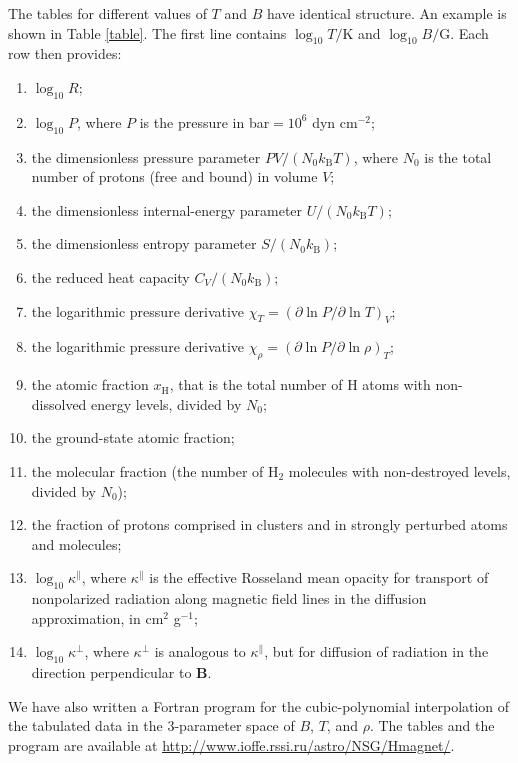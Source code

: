 \documentclass{emulateapj}
\newcommand{\kB}{k_\mathrm{B}}
\begin{document}
The tables for different values of $T$ and $B$
 have identical structure. 
An example is shown in Table \ref{table}.
 The first line contains $\log_{10} T/\mbox{K}$ and $\log_{10} B/\mbox{G}$.
 Each row then provides:
 \begin{enumerate}
\setlength{\itemsep}{0pt}
\item $\log_{10} R$;
\item $\log_{10} P$, where $P$ is the pressure in bar$=10^6$ dyn cm$^{-2}$;
\item the dimensionless pressure parameter $PV/(N_0\kB T)$, where $N_0$ is the total number of protons
(free and bound) in volume $V$;
\item the dimensionless internal-energy parameter $U/(N_0\kB T)$;
\item the dimensionless entropy parameter $S/(N_0\kB)$;
\item the reduced heat capacity $C_V/(N_0\kB)$;
\item the logarithmic pressure derivative $\chi_T=(\partial\ln P/\partial\ln T)_V$;
\item the logarithmic pressure derivative  $\chi_\rho=(\partial\ln P/\partial\ln \rho)_T$;
\item the atomic fraction  $x_\mathrm{H}$, that is 
    the total number of H atoms with non-dissolved energy levels,
    divided by $N_0$;             
\item the ground-state atomic fraction;
\item the molecular fraction (the number of H$_2$ molecules with non-destroyed levels, divided by $N_0$);
\item the fraction of protons comprised in clusters and in strongly perturbed atoms and molecules;
\item $\log_{10}\kappa^\|$, where $\kappa^\|$ is the effective Rosseland mean opacity 
 for transport of nonpolarized radiation
 along magnetic field lines in the diffusion approximation, in cm$^2$ g$^{-1}$;
\item $\log_{10}\kappa^\perp$, where $\kappa^\perp$ is analogous 
  to $\kappa^\|$, but for diffusion of radiation 
  in the direction perpendicular to $\bm{B}$.
\end{enumerate}

We have also written a Fortran program for the cubic-polynomial 
interpolation of the tabulated data in the 3-parameter space
of $B$, $T$, and $\rho$.
The tables and the program are available at 
\url{http://www.ioffe.rssi.ru/astro/NSG/Hmagnet/}.

\end{document}
